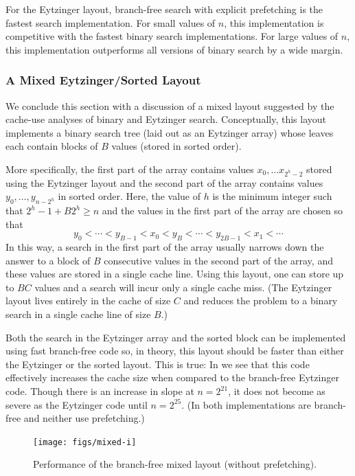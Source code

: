 \documentclass{patmorin}
\begin{document}
\begin{lesson}
  For the Eytzinger layout, branch-free search with explicit prefetching
  is the fastest search implementation. For small values of $n$,
  this implementation is competitive with the fastest binary search
  implementations. For large values of $n$, this implementation
  outperforms all versions of binary search by a wide margin.
\end{lesson}

\subsubsection{A Mixed Eytzinger/Sorted Layout}

We conclude this section with a discussion of a mixed layout suggested by
the cache-use analyses of binary and Eytzinger search.  Conceptually, this
layout implements a binary search tree (laid out as an Eytzinger array)
whose leaves each contain blocks of $B$ values (stored in sorted order).

More specifically, the first part of the array contains values $x_0,\ldots
x_{2^{h}-2}$ stored using the Eytzinger layout and the second part of
the array contains values $y_0,\ldots,y_{n-2^h}$ in sorted order.  Here,
the value of $h$ is the minimum integer such that $2^{h}-1 + B2^h \ge n$
and the values in the first part of the array are chosen so that
\[
    y_0<\cdots<y_{B-1} < x_0 < y_{B}<\cdots<y_{2B-1} < x_1 < \cdots
\]
In this way, a search in the first part of the array usually narrows
down the answer to a block of $B$ consecutive values in the second part
of the array, and these values are stored in a single cache line. Using
this layout, one can store up to $BC$ values and a search will incur
only a single cache miss. (The Eytzinger layout lives entirely in the
cache of size $C$ and reduces the problem to a binary search in a single
cache line of size $B$.)

Both the search in the Eytzinger array and the sorted block can be
implemented using fast branch-free code so, in theory, this layout
should be faster than either the Eytzinger or the sorted layout.
This is true: In  we see that this code effectively
increases the cache size when compared to the branch-free Eytzinger code.
Though there is an increase in slope at $n=2^{21}$, it does not become
as severe as the Eytzinger code until $n=2^{25}$.  (In 
both implementations are branch-free and neither use prefetching.)

\begin{figure}
   \begin{center}
     \texttt{[image: figs/mixed-i]}
   \end{center}
   \caption{Performance of the branch-free mixed layout (without prefetching).}
\end{figure}
\end{document}
